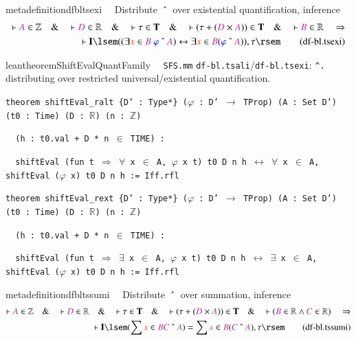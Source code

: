 \begin{restatable}{metadefinition}{dfbltsexi}~~ Distribute $~\string^~$ over
existential quantification, inference
\begin{align}
\vdash \mc{A} \in \mathbb{Z}\quad\&\quad \vdash \mc{D} \in
    \mathbb{R}\quad\&\quad \vdash \tau \in \mathbf{T}\quad\&\quad \vdash ( \tau
    + ( \mc{D} \times \mc{A} ) ) \in \mathbf{T}\quad\&\quad \vdash \mc{B} \in
    \mathbb{R}\quad\Rightarrow \notag \\
    \quad \vdash \mathbf{I} \lsem ( ( \exists \msc{x}
    \in \mc{B}~\mw{\varphi} ~\string^~ \mc{A} ) \leftrightarrow \exists \msc{x}
    \in \mc{B} ( \mw{\varphi} ~\string^~ \mc{A} ) ) , \tau
    \rsem\label{eq:df-bl.tsexi}\tag{df-bl.tsexi}
\end{align}
\end{restatable}

\begin{restatable}{leantheorem}{ShiftEvalQuantFamily}~~ \texttt{SFS.mm} \texttt{df-bl.tsali}/\texttt{df-bl.tsexi}: \texttt{\^{}.} distributing over restricted universal/existential quantification.

\texttt{\textcolor{leancolor}{theorem} \textcolor{leanyellow}{shiftEval\_ralt} \{D' : Type*\} ($\varphi$ : D' $\to$ TProp) (A : Set D') (t0 : Time) (D : $\mathbb{R}$) (n : $\mathbb{Z}$)}

\texttt{~~(h : t0.val + D * n $\in$ TIME) :}

\texttt{~~shiftEval (\textcolor{leancolor}{fun} t $\Rightarrow$ $\forall$ x $\in$ A, $\varphi$ x t) t0 D n h $\leftrightarrow$ $\forall$ x $\in$ A, shiftEval ($\varphi$ x) t0 D n h := Iff.rfl}

\texttt{\textcolor{leancolor}{theorem} \textcolor{leanyellow}{shiftEval\_rext} \{D' : Type*\} ($\varphi$ : D' $\to$ TProp) (A : Set D') (t0 : Time) (D : $\mathbb{R}$) (n : $\mathbb{Z}$)}

\texttt{~~(h : t0.val + D * n $\in$ TIME) :}

\texttt{~~shiftEval (\textcolor{leancolor}{fun} t $\Rightarrow$ $\exists$ x $\in$ A, $\varphi$ x t) t0 D n h $\leftrightarrow$ $\exists$ x $\in$ A, shiftEval ($\varphi$ x) t0 D n h := Iff.rfl}
\label{shiftEval_ralt}
\label{shiftEval_rext}
\end{restatable}

\begin{restatable}{metadefinition}{dfbltssumi}~~ Distribute $~\string^~$ over
summation, inference
\begin{align}
\vdash \mc{A} \in \mathbb{Z}\quad\&\quad \vdash \mc{D} \in
    \mathbb{R}\quad\&\quad \vdash \tau \in \mathbf{T}\quad\&\quad \vdash ( \tau
    + ( \mc{D} \times \mc{A} ) ) \in \mathbf{T}\quad\&\quad \vdash ( \mc{B} \in
    \mathbb{R} \wedge \mc{C} \in \mathbb{R} )\quad\Rightarrow \notag \\
    \quad \vdash
    \mathbf{I} \lsem ( \sum \msc{x} \in \mc{B} \mc{C} ~\string^~ \mc{A} ) =
    \sum \msc{x} \in \mc{B} ( \mc{C} ~\string^~ \mc{A} ) , \tau
    \rsem\label{eq:df-bl.tssumi}\tag{df-bl.tssumi}
\end{align}
\end{restatable}


